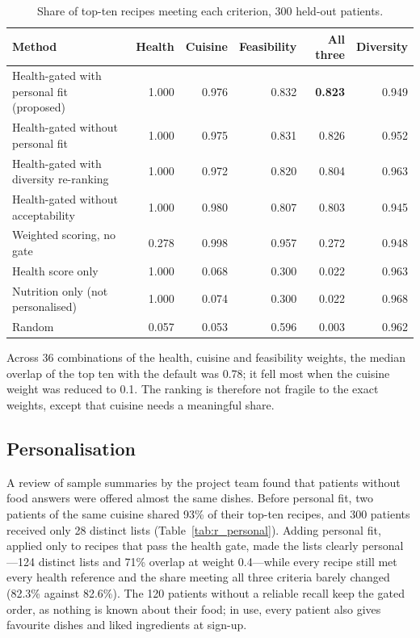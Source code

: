 \begin{table}[htbp]
\centering
\caption{Share of top-ten recipes meeting each criterion, 300 held-out patients.}
\label{tab:r_methods}
\begin{tabular}{p{6.4cm}rrrrr}
\toprule
Method & Health & Cuisine & Feasibility & All three & Diversity \\
\midrule
Health-gated with personal fit (proposed) & 1.000 & 0.976 & 0.832 & \textbf{0.823} & 0.949 \\
Health-gated without personal fit & 1.000 & 0.975 & 0.831 & 0.826 & 0.952 \\
Health-gated with diversity re-ranking & 1.000 & 0.972 & 0.820 & 0.804 & 0.963 \\
Health-gated without acceptability & 1.000 & 0.980 & 0.807 & 0.803 & 0.945 \\
Weighted scoring, no gate & 0.278 & 0.998 & 0.957 & 0.272 & 0.948 \\
Health score only & 1.000 & 0.068 & 0.300 & 0.022 & 0.963 \\
Nutrition only (not personalised) & 1.000 & 0.074 & 0.300 & 0.022 & 0.968 \\
Random & 0.057 & 0.053 & 0.596 & 0.003 & 0.962 \\
\bottomrule
\end{tabular}
\end{table}

Across 36 combinations of the health, cuisine and feasibility weights, the
median overlap of the top ten with the default was 0.78; it fell most when the
cuisine weight was reduced to 0.1. The ranking is therefore not fragile to the
exact weights, except that cuisine needs a meaningful share.

\subsection{Personalisation}

A review of sample summaries by the project team found that patients without
food answers were offered almost the same dishes. Before personal fit, two
patients of the same cuisine shared 93\% of their top-ten recipes, and 300
patients received only 28 distinct lists (Table~\ref{tab:r_personal}). Adding
personal fit, applied only to recipes that pass the health gate, made the
lists clearly personal---124 distinct lists and 71\% overlap at weight
0.4---while every recipe still met every health reference and the share
meeting all three criteria barely changed (82.3\% against 82.6\%). The 120
patients without a reliable recall keep the gated order, as nothing is known
about their food; in use, every patient also gives favourite dishes and liked
ingredients at sign-up.

